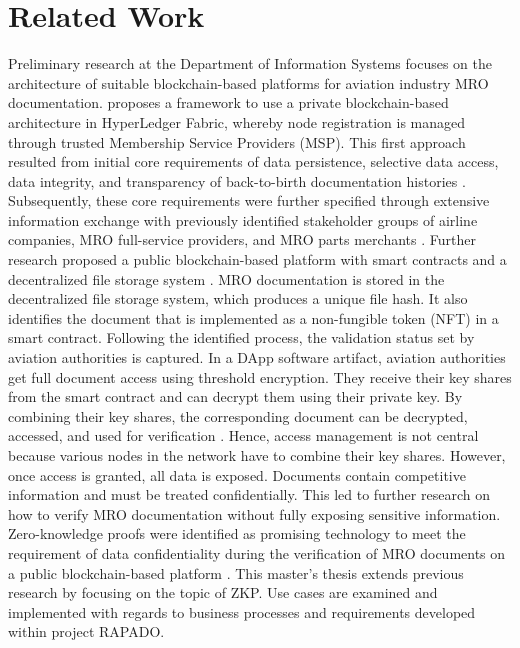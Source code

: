 \chapter{Related Work}
\begin{comment}
-knowledge base I build upon
- related papers can be: content related, methodology, technical -->structure accordingly

(in a thesis, it is mandatory to have Related Systems, when you implement an application)
- Sedlmeier, V{/"u}lter, Str{/"u}ker (2021): trading green energy certificates: same problem of verification vs privacy, Implementation architecture based on zk RollUps, very good reasoning about requirements (same as Rapado), maybe a good starting point to create an architecture as second artifact for rapado? architecture to verify information about certificates
\end{comment}
Preliminary research at the Department of Information Systems focuses on the architecture of suitable blockchain-based platforms for aviation industry MRO documentation. \citet{WickboldtMeiseKliewer} proposes a framework to use a private blockchain-based architecture in HyperLedger Fabric, whereby node registration is managed through trusted Membership Service Providers (MSP). This first approach resulted from initial core requirements of data persistence, selective data access, data integrity, and transparency of back-to-birth documentation histories \citep{WickboldtClemens2018BzdD}. Subsequently, these core requirements were further specified through extensive information exchange with previously identified stakeholder groups of airline companies, MRO full-service providers, and MRO parts merchants \citep{ZedelJ}. Further research proposed a public blockchain-based platform with smart contracts and a decentralized file storage system \citep{semesterproject, ZedelJ}. MRO documentation is stored in the decentralized file storage system, which produces a unique file hash. It also identifies the document that is implemented as a non-fungible token (NFT) in a smart contract. Following the identified process, the validation status set by aviation authorities is captured. In a DApp software artifact, aviation authorities get full document access using threshold encryption. They receive their key shares from the smart contract and can decrypt them using their private key. By combining their key shares, the corresponding document can be decrypted, accessed, and used for verification \citep{semesterproject}. Hence, access management is not central because various nodes in the network have to combine their key shares. However, once access is granted, all data is exposed. Documents contain competitive information and must be treated confidentially. This led to further research on how to verify MRO documentation without fully exposing sensitive information. Zero-knowledge proofs were identified as promising technology to meet the requirement of data confidentiality during the verification of MRO documents on a public blockchain-based platform \citep{ZedelJ}. This master's thesis extends previous research by focusing on the topic of ZKP. Use cases are examined and implemented with regards to business processes and requirements developed within project RAPADO.
